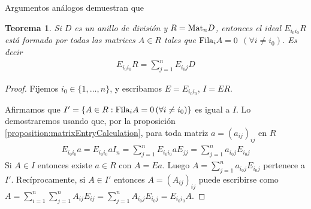 \documentclass{report}
\newcommand{\Mat}{\textnormal{Mat}}
\newcommand{\Fila}{\textnormal{Fila}}
\newtheorem{theorem}{Teorema}
\begin{document}
  Argumentos análogos demuestran que
  \begin{theorem}
    \label{theorem:matricesWhereAlmostEveryRowIsNull}
    Si \(D\) es un anillo de división y \(R = \Mat_n D\), entonces el ideal \(E_{i_0 i_0} R\) está formado por todas las matrices \(A \in R\) tales que \(\Fila_i A = 0\) \((\forall i \neq i_0)\).
    Es decir
    \begin{align}
      E_{i_0 i_0} R
      =
      \sum_{j = 1}^n E_{i_0 j} D
    \end{align}
  \end{theorem}
  \begin{proof}
    Fijemos \(i_0 \in \{1, \dots, n\}\), y escribamos \(E = E_{i_0 i_0}\), \(I = E R\).

    Afirmamos que \(I' = \{A \in R : \Fila_i A = 0 \, (\forall i \neq i_0)\}\) es igual a \(I\).
    Lo demostraremos usando que, por la proposición \ref{proposition:matrixEntryCalculation}, para toda matriz \(a = (a_{i j})_{i j}\) en \(R\)
    \begin{align}
      E_{i_0 i_0} a
      =
      E_{i_0 i_0} a I_n
      =
      \sum_{j = 1}^n E_{i_0 i_0} a E_{j j}
      =
      \sum_{j = 1}^n a_{i_0 j} E_{i_0 j}
    \end{align}
    Si \(A \in I\) entonces existe \(a \in R\) con \(A = E a\).
    Luego \(A = \sum_{j = 1}^n a_{i_0 j} E_{i_0 j}\) pertenece a \(I'\).
    Recíprocamente, si \(A \in I'\) entonces \(A = (A_{i j})_{i j}\) puede escribirse como \(A = \sum_{i = 1}^n \sum_{j = 1}^n A_{i j} E_{i j} = \sum_{j = 1}^n A_{i_0 j} E_{i_0 j} = E_{i_0 i_0} A\).
  \end{proof}
\end{document}
